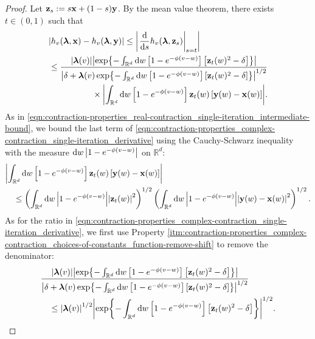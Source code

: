 \documentclass[11pt]{article}
\newcommand{\R}{\mathbb R}
\newcommand{\bl}{\bm{\lambda}}
\newcommand{\bx}{\vb{x}}
\newcommand{\by}{\vb{y}}
\newcommand{\bz}{\vb{z}}
\numberwithin{equation}{section}
\theoremstyle{plain}
\theoremstyle{definition}
\theoremstyle{remark}
\begin{document}
\begin{proof}
Let $\bz_{s}:=s\bx+(1-s)\by$.
By the mean value theorem, there exists $t\in(0,1)$ such that
\begin{equation}
\label{eqn:contraction-properties_complex-contraction_single-iteration_derivative}
\begin{multlined}
\abs{h_{v}(\bl,\bx)-h_{v}(\bl,\by)}
\le\abs{\eval{\dv{s}h_{v}(\bl,\bz_{s})}_{s=t}}
\\
\le \frac{\abs{\bl(v)}\abs{\exp{-\int_{\R^{d}}\dd{w}\left[1-e^{-\phi(v-w)}\right]\left[\bz_{t}(w)^{2}-\delta\right]}}}{\abs{\delta+\bl(v)\exp{-\int_{\R^{d}}\dd{w}\left[1-e^{-\phi(v-w)}\right][\bz_{t}(w)^{2}-\delta]}}^{1/2}}
\\
\times
\abs{\int_{\R^{d}}\dd{w}\left[1-e^{-\phi(v-w)}\right]\bz_{t}(w)\left[\by(w)-\bx(w)\right]}.
\end{multlined}
\end{equation}
As in \eqref{eqn:contraction-properties_real-contraction_single-iteration_intermediate-bound}, we bound the last term of \eqref{eqn:contraction-properties_complex-contraction_single-iteration_derivative} using the Cauchy-Schwarz inequality with the measure $\dd{w}\abs{1-e^{-\phi(v-w)}}$ on $\R^{d}$:
\begin{equation}
\begin{multlined}
\abs{\int_{\R^{d}}\dd{w}\left[1-e^{-\phi(v-w)}\right]\bz_{t}(w)\left[\by(w)-\bx(w)\right]}
\\
\le \left(\int_{\R^{d}}\dd{w}\abs{1-e^{-\phi(v-w)}}\abs{\bz_{t}(w)}^{2}
\right)^{1/2}
\left(\int_{\R^{d}}\dd{w}\abs{1-e^{-\phi(v-w)}}\abs{\by(w)-\bx(w)}^{2}\right)^{1/2}.
\end{multlined}
\end{equation}
As for the ratio in \eqref{eqn:contraction-properties_complex-contraction_single-iteration_derivative}, we first use Property \ref{itm:contraction-properties_complex-contraction_choices-of-constants_function-remove-shift} to remove the denominator:
\begin{equation}
\begin{multlined}
\frac{\abs{\bl(v)}\abs{\exp{-\int_{\R^{d}}\dd{w}\left[1-e^{-\phi(v-w)}\right]\left[\bz_{t}(w)^{2}-\delta\right]}}}{\abs{\delta+\bl(v)\exp{-\int_{\R^{d}}\dd{w}\left[1-e^{-\phi(v-w)}\right][\bz_{t}(w)^{2}-\delta]}}^{1/2}}
\\
\le\abs{\bl(v)}^{1/2}\abs{\exp{-\int_{\R^{d}}\dd{w}\left[1-e^{-\phi(v-w)}\right]\left[\bz_{t}(w)^{2}-\delta\right]}}^{1/2}.
\end{multlined}
\end{equation}

\end{proof}
\end{document}
